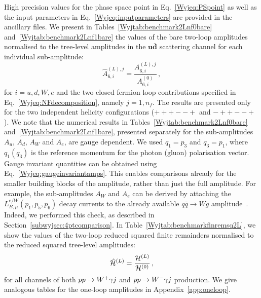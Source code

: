 \documentclass[main.tex]{subfiles}
\begin{document}
High precision values for the phase space point in Eq.~\ref{Wyjeq:PSpoint} as well as the input parameters in Eq.~\ref{Wyjeq:inputparameters} are provided in the ancillary files.
We present in Tables~\ref{Wyjtab:benchmark2Lnf0bare} and~\ref{Wyjtab:benchmark2Lnf1bare} the values of the bare two-loop amplitudes
normalised to the tree-level amplitudes in the $\mathbf{u\bar{d}}$ scattering channel for each individual sub-amplitude:
\begin{equation}  \label{Wyjeq:treenorm}
\hat{A}_{6,i}^{(L),j} = \frac{A_{6,i}^{(L),j}}{A_{6,i}^{(0)}} \,, 
\end{equation} 
for $i = u,d,W,e$ and the two closed fermion loop contributions specified in Eq.~\ref{Wyjeq:NFdecomposition}, namely $j=1,n_f$.
The results are presented only for the two independent helicity configurations ($\scriptstyle +++--+$ and $\scriptstyle -++--+$).
We note that the numerical results in Tables~\ref{Wyjtab:benchmark2Lnf0bare} and~\ref{Wyjtab:benchmark2Lnf1bare}, presented separately for the sub-amplitudes $A_u$, $A_d$, $A_W$ and $A_e$,
are gauge dependent. We used  $q_1 = p_3$ and $q_3 = p_1$, where $q_1 (q_3)$ is the reference momentum for the photon (gluon) polarisation vector. Gauge invariant quantities can be obtained using Eq.~\ref{Wyjeq:gaugeinvariantamps}. This enables comparisons already for the smaller building blocks of the amplitude, rather than just the full amplitude. For example, the sub-amplitudes $A_W$ and $A_e$ can be derived by attaching the $L^{e/W}_{B,\mu}(p_1,p_5,p_6)$ decay currents to the already available $q\bar{q} \to Wg$ 
amplitude~\cite{Gehrmann:2011ab}. Indeed, we performed this check, as described in Section~\ref{subwyjsec:4ptcomparison}. 
In Table~\ref{Wyjtab:benchmarkfinremsq2L}, we show the values of the two-loop reduced squared finite remainders normalised to the reduced squared tree-level amplitudes: 
\begin{equation}
\hat{\mathcal{H}}^{(L)} = \frac{\mathcal{H}^{(L)}}{\mathcal{H}^{(0)}} \,,
\end{equation}
for all channels of both $pp \to W^+\gamma j$ and $pp\to W^-\gamma j$ production. We give analogous tables for the one-loop amplitudes in Appendix~\ref{app:oneloop}.
%
\end{document}

